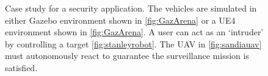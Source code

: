 \begin{figure}
\caption{Case study for a security application. The vehicles are simulated in either Gazebo environment shown in \ref{fig:GazArena} or a UE4 environment shown in \ref{fig:GazArena}. A user can act as an `intruder' by controlling a target \ref{fig:stanleyrobot}. The UAV in \ref{fig:sandiauav} must autonomously react to guarantee the surveillance mission is satisfied. }
\label{fig:SandiaCaseSTudy}
\end{figure}